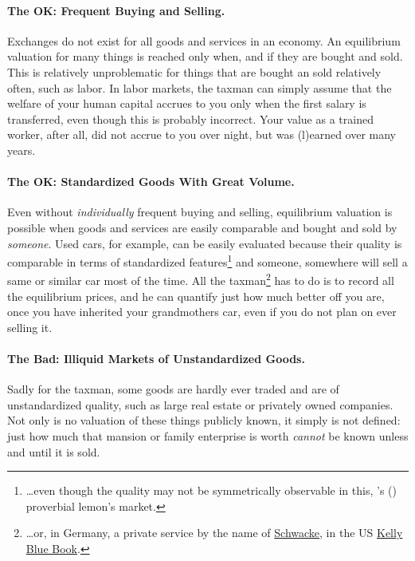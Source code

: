 \paragraph{The OK: Frequent Buying and Selling.} Exchanges do not exist for all goods and services in an economy. An equilibrium valuation for many things is reached only when, and if they are bought and sold.
This is relatively unproblematic for things that are bought an sold relatively often, such as labor. In labor markets, the taxman can simply assume that the welfare of your human capital accrues to you only when the first salary is transferred, even though this is probably incorrect. Your value as a trained worker, after all, did not accrue to you over night, but was (l)earned over many years.

\paragraph{The OK: Standardized Goods With Great Volume.} Even without \emph{individually} frequent buying and selling, equilibrium valuation is possible when goods and services are easily comparable and bought and sold by \emph{someone}. Used cars, for example, can be easily evaluated because their quality is comparable in terms of standardized features\footnote{\ldots even though the quality may not be symmetrically observable in this, \citeauthor{Akerlof-1970-aa}'s (\citeyear{Akerlof-1970-aa}) proverbial lemon's market.} and someone, somewhere will sell a same or similar car most of the time. All the taxman\footnote{\ldots or, in Germany, a private service by the name of \href{http://www.schwacke.de/}{Schwacke}, in the US \href{http://www.kbb.com/}{Kelly Blue Book}.} has to do is to record all the equilibrium prices, and he can quantify just how much better off you are, once you have inherited your grandmothers car, even if you do not plan on ever selling it.

\paragraph{The Bad: Illiquid Markets of Unstandardized Goods.} Sadly for the taxman, some goods are hardly ever traded and are of unstandardized quality, such as large real estate or privately owned companies. Not only is no valuation of these things publicly known, it simply is not defined: just how much that mansion or family enterprise is worth \emph{cannot} be known unless and until it is sold.

